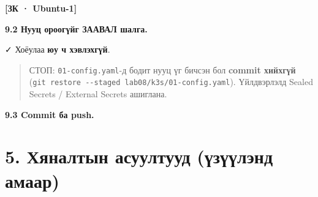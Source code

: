 \textbf{{[}ЗК · Ubuntu-1{]}}

\begin{Shaded}
\begin{Highlighting}[]
\end{Highlighting}
\end{Shaded}

\textbf{9.2 Нууц ороогүйг ЗААВАЛ шалга.}

\begin{Shaded}
\begin{Highlighting}[]
\KeywordTok{|} 
\KeywordTok{|} 
\end{Highlighting}
\end{Shaded}

✓ Хоёулаа \textbf{юу ч хэвлэхгүй}.

\begin{quote}
СТОП: \texttt{01-config.yaml}-д бодит нууц үг бичсэн бол \textbf{commit хийхгүй} (\texttt{git\ restore\ -\/\allowbreak{}-staged\ lab08/\allowbreak{}k3s/\allowbreak{}01-config.\allowbreak{}yaml}). Үйлдвэрлэлд Sealed Secrets / External Secrets ашиглана.
\end{quote}

\textbf{9.3 Commit ба push.}

\begin{Shaded}
\begin{Highlighting}[]
\KeywordTok{\&\&} 
\end{Highlighting}
\end{Shaded}

\hypertarget{ux445ux44fux43dux430ux43bux442ux44bux43d-ux430ux441ux443ux443ux43bux442ux443ux443ux434-ux4afux437ux4afux4afux43bux44dux43dux434-ux430ux43cux430ux430ux440}{%
\section{5. Хяналтын асуултууд (үзүүлэнд амаар)}\label{ux445ux44fux43dux430ux43bux442ux44bux43d-ux430ux441ux443ux443ux43bux442ux443ux443ux434-ux4afux437ux4afux4afux43bux44dux43dux434-ux430ux43cux430ux430ux440}}

